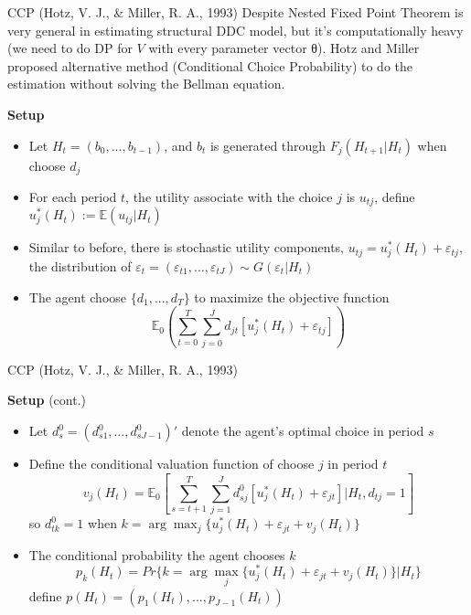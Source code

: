 \documentclass[10pt]{beamer}
\begin{document}
\begin{frame}{CCP (Hotz, V. J., \& Miller, R. A., 1993)}
Despite Nested Fixed Point Theorem is very general in estimating structural DDC model, but it's computationally heavy (we need to do DP for $V$ with every parameter vector θ). Hotz and Miller proposed alternative method (Conditional Choice Probability) to do the estimation without solving the Bellman equation.

\textbf{Setup}
\begin{itemize}
	\item Let $H_t = (b_0,...,b_{t-1})$, and $b_t$ is generated through $F_j(H_{t+1}|H_t)$ when choose $d_j$
	\item For each period $t$, the utility associate with the choice $j$ is $u_{tj}$, define $u^*_j(H_t):=\mathbb{E}(u_{tj}|H_t)$
	\item Similar to before, there is stochastic utility components, $u_{tj} = u^*_j(H_t)+\varepsilon_{tj}$, the distribution of $\varepsilon_t = (\varepsilon_{t1},...,\varepsilon_{tJ})\sim G(\varepsilon_t|H_t)$
	\item The agent choose $\{d_1,...,d_T\}$ to maximize the objective function
	$$\mathbb{E}_0(\sum_{t=0}^T\sum_{j=0}^Jd_{jt}[u^*_j(H_t)+\varepsilon_{tj}])$$	
\end{itemize}
\end{frame}

\begin{frame}{CCP (Hotz, V. J., \& Miller, R. A., 1993)}


\textbf{Setup} (cont.)
\begin{itemize}
	\item Let $d_s^0 = (d_{s1}^0,...,d_{sJ-1}^0)'$ denote the agent's optimal choice in period $s$
	\item Define the conditional valuation function of choose $j$ in period $t$
	$$v_j(H_t)=\mathbb{E}_0[\sum_{s=t+1}^T \sum_{j=1}^J d_{sj}^0[u_j^*(H_t)+\varepsilon_{jt}]|H_t,d_{tj}=1]$$
	so $d_{tk}^0 = 1$ when $k=\arg\max_{j}\{u_j^*(H_t)+\varepsilon_{jt}+v_{j}(H_t)\}$
	\item The conditional probability the agent chooses $k$
	$$p_k(H_t) = Pr\{k=\arg\max_{j}\{u_j^*(H_t)+\varepsilon_{jt}+v_{j}(H_t)\}|H_t\}$$
	define $p(H_t) = (p_1(H_t),...,p_{J-1}(H_t))$
\end{itemize}
\end{frame}
\end{document}
